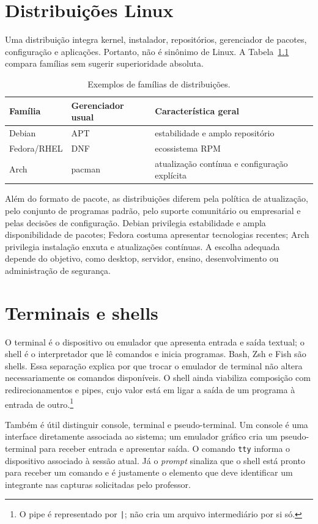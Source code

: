 \documentclass[12pt,openright,oneside,a4paper,brazil]{abntex2}
\begin{document}
\chapter{Distribuições Linux}
Uma distribuição integra kernel, instalador, repositórios, gerenciador de pacotes, configuração e aplicações. Portanto, não é sinônimo de Linux. A Tabela~\ref{tab:distros} compara famílias sem sugerir superioridade absoluta.
\begin{table}[htbp]\centering
\caption{Exemplos de famílias de distribuições.}\label{tab:distros}
\begin{tabular}{lll}\toprule
Família & Gerenciador usual & Característica geral\\\midrule
Debian & APT & estabilidade e amplo repositório\\
Fedora/RHEL & DNF & ecossistema RPM\\
Arch & pacman & atualização contínua e configuração explícita\\\bottomrule
\end{tabular}
\end{table}
Além do formato de pacote, as distribuições diferem pela política de atualização, pelo conjunto de programas padrão, pelo suporte comunitário ou empresarial e pelas decisões de configuração. Debian privilegia estabilidade e ampla disponibilidade de pacotes; Fedora costuma apresentar tecnologias recentes; Arch privilegia instalação enxuta e atualizações contínuas. A escolha adequada depende do objetivo, como desktop, servidor, ensino, desenvolvimento ou administração de segurança.

\chapter{Terminais e shells}
O terminal é o dispositivo ou emulador que apresenta entrada e saída textual; o shell é o interpretador que lê comandos e inicia programas. Bash, Zsh e Fish são shells. Essa separação explica por que trocar o emulador de terminal não altera necessariamente os comandos disponíveis. O shell ainda viabiliza composição com redirecionamentos e pipes, cujo valor está em ligar a saída de um programa à entrada de outro.\footnote{O pipe é representado por \texttt{|}; não cria um arquivo intermediário por si só.}

Também é útil distinguir console, terminal e pseudo-terminal. Um console é uma interface diretamente associada ao sistema; um emulador gráfico cria um pseudo-terminal para receber entrada e apresentar saída. O comando \texttt{tty} informa o dispositivo associado à sessão atual. Já o \textit{prompt} sinaliza que o shell está pronto para receber um comando e é justamente o elemento que deve identificar um integrante nas capturas solicitadas pelo professor.
\end{document}
